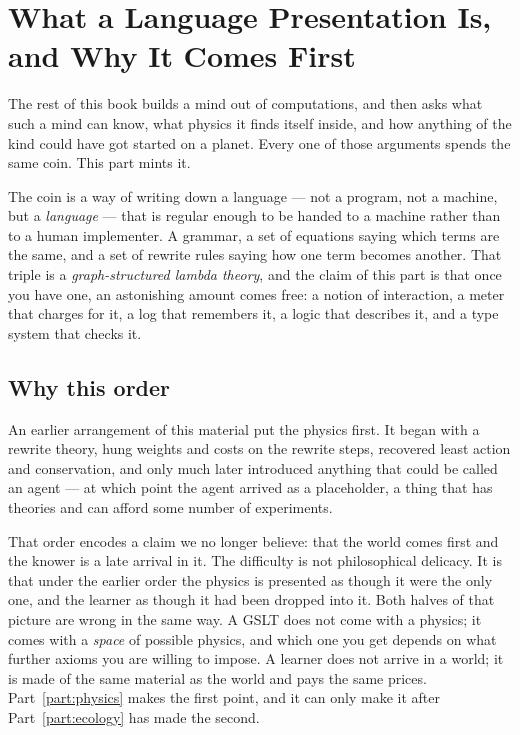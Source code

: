 \chapter{What a Language Presentation Is, and Why It Comes First}
\label{ch:gslt-intro}

The rest of this book builds a mind out of computations, and then asks
what such a mind can know, what physics it finds itself inside, and how
anything of the kind could have got started on a planet.
Every one of those arguments spends the same coin.
This part mints it.

The coin is a way of writing down a language --- not a program, not a
machine, but a \emph{language} --- that is regular enough to be handed to
a machine rather than to a human implementer.
A grammar, a set of equations saying which terms are the same, and a set
of rewrite rules saying how one term becomes another.
That triple is a \emph{graph-structured lambda theory}, and the claim of
this part is that once you have one, an astonishing amount comes free:
a notion of interaction, a meter that charges for it, a log that
remembers it, a logic that describes it, and a type system that checks
it.

\section{Why this order}

An earlier arrangement of this material put the physics first.
It began with a rewrite theory, hung weights and costs on the rewrite
steps, recovered least action and conservation, and only much later
introduced anything that could be called an agent --- at which point the
agent arrived as a placeholder, a thing that has theories and can afford
some number of experiments.

That order encodes a claim we no longer believe: that the world comes
first and the knower is a late arrival in it.
The difficulty is not philosophical delicacy.
It is that under the earlier order the physics is presented as though it
were the only one, and the learner as though it had been dropped into
it.
Both halves of that picture are wrong in the same way.
A GSLT does not come with a physics; it comes with a \emph{space} of
possible physics, and which one you get depends on what further axioms
you are willing to impose.
A learner does not arrive in a world; it is made of the same material as
the world and pays the same prices.
Part~\ref{part:physics} makes the first point, and it can only make it
after Part~\ref{part:ecology} has made the second.

